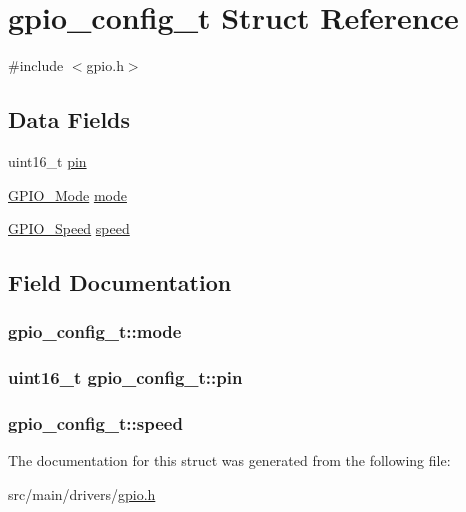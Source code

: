 \hypertarget{structgpio__config__t}{\section{gpio\+\_\+config\+\_\+t Struct Reference}
\label{structgpio__config__t}
}


{\ttfamily \#include $<$gpio.\+h$>$}

\subsection*{Data Fields}
\begin{DoxyCompactItemize}
\item 
uint16\+\_\+t \hyperlink{structgpio__config__t_a5871cbb2be3825fc029ba2d87a061dd4}{pin}
\item 
\hyperlink{test_2unit_2platform_8h_ae647a44ad55704d3f447db1de2858e1b}{G\+P\+I\+O\+\_\+\+Mode} \hyperlink{structgpio__config__t_a85642bf83f1e63c21df6c3782d232ac5}{mode}
\item 
\hyperlink{gpio_8h_ac967ddf2cbb349c4aae69fab380498b0}{G\+P\+I\+O\+\_\+\+Speed} \hyperlink{structgpio__config__t_af9de760ecf6bb40a028c3cd02eaab721}{speed}
\end{DoxyCompactItemize}


\subsection{Field Documentation}
\hypertarget{structgpio__config__t_a85642bf83f1e63c21df6c3782d232ac5}{
\subsubsection[{mode}]{ gpio\+\_\+config\+\_\+t\+::mode}}\label{structgpio__config__t_a85642bf83f1e63c21df6c3782d232ac5}
\hypertarget{structgpio__config__t_a5871cbb2be3825fc029ba2d87a061dd4}{
\subsubsection[{pin}]{\setlength{\rightskip}{0pt plus 5cm}uint16\+\_\+t gpio\+\_\+config\+\_\+t\+::pin}}\label{structgpio__config__t_a5871cbb2be3825fc029ba2d87a061dd4}
\hypertarget{structgpio__config__t_af9de760ecf6bb40a028c3cd02eaab721}{
\subsubsection[{speed}]{ gpio\+\_\+config\+\_\+t\+::speed}}\label{structgpio__config__t_af9de760ecf6bb40a028c3cd02eaab721}


The documentation for this struct was generated from the following file\+:\begin{DoxyCompactItemize}
\item 
src/main/drivers/\hyperlink{gpio_8h}{gpio.\+h}\end{DoxyCompactItemize}

